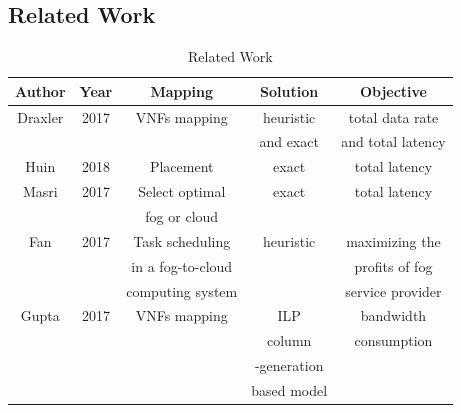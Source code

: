 \documentclass{beamer}
\begin{document}
\subsection{Related Work}
\begin{frame}
	\begin{table}
		\begin{tabular}{|c|c|c|c|c|}
			\toprule
			\textbf{Author} & \textbf{Year} & \textbf{Mapping} &\textbf{Solution}& \textbf{Objective}\\
			\midrule
			Draxler & 2017 & VNFs mapping & heuristic & total data rate \\
			 & & & and exact & and total latency\\
			 \hline
			 Huin &2018 & Placement& exact &total latency\\
             \hline
             Masri&2017& Select optimal  &exact &total latency\\
              & & fog or cloud& & \\
             \hline
             Fan&2017&Task scheduling & heuristic & maximizing the  \\
              & &in a fog-to-cloud & &profits of fog  \\
               & & computing system & & service provider \\
               \hline
               Gupta& 2017& VNFs mapping & ILP  & bandwidth \\
               & & & column&consumption\\
               & & & -generation& \\
               & & &based model &\\
			\bottomrule
		\end{tabular}
		\caption{Related Work}
	\end{table}
	
\end{frame}
\end{document}
